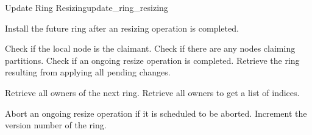 \begin{actionbox}{Update Ring Resizing}{update_ring_resizing}
	\begin{action}
		 Install the future ring after an resizing operation is completed.
		\begin{action}
			 Check if the local node is the claimant.
			 Check if there are any nodes claiming partitions.
			 Check if an ongoing resize operation is completed.
			 Retrieve the ring resulting from applying all pending changes.
			\begin{action}
				 Retrieve all owners of the next ring.
				 Retrieve all owners to get a list of indices.
			\end{action}
			 Abort an ongoing resize operation if it is scheduled to be aborted.
			 Increment the version number of the ring.
		\end{action}
	\end{action}
\end{actionbox}

